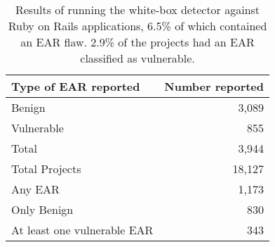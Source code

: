 \begin{table}[tb]
  \centering
  \begin{tabular}{lr}
    Type of EAR reported & Number reported \\
    \hline
    Benign & 3,089 \\
    Vulnerable & 855 \\
    Total & 3,944 \\
    \hline
    \hline
    Total Projects & 18,127 \\
    Any EAR & 1,173 \\
    Only Benign & 830 \\
    At least one vulnerable EAR & 343 \\
    \hline
  \end{tabular}
  \caption{Results of running the white-box detector against Ruby on
    Rails applications, 6.5\% of which contained an EAR flaw. 2.9\% of
    the projects had an EAR classified as vulnerable.}
\end{table}

